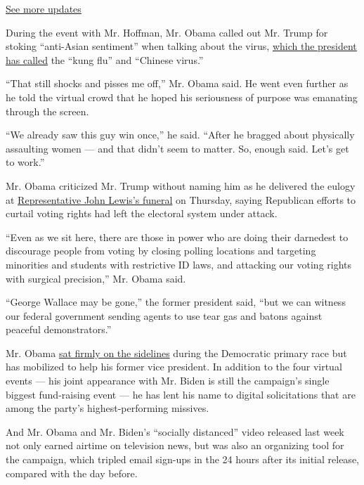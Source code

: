 \href{https://www.nytimes.com/2020/07/31/us/elections/biden-vs-trump.html?action=click\&pgtype=Article\&state=default\&region=MAIN_CONTENT_1\&context=storylines_live_updates}{See
more updates}

During the event with Mr. Hoffman, Mr. Obama called out Mr. Trump for
stoking ``anti-Asian sentiment'' when talking about the virus,
\href{https://www.nytimes.com/2020/03/18/us/politics/china-virus.html}{which
the president has called} the ``kung flu'' and ``Chinese virus.''

``That still shocks and pisses me off,'' Mr. Obama said. He went even
further as he told the virtual crowd that he hoped his seriousness of
purpose was emanating through the screen.

``We already saw this guy win once,'' he said. ``After he bragged about
physically assaulting women --- and that didn't seem to matter. So,
enough said. Let's get to work.''

Mr. Obama criticized Mr. Trump without naming him as he delivered the
eulogy at
\href{https://www.nytimes.com/2020/07/30/us/john-lewis-live-funeral.html}{Representative
John Lewis's funeral} on Thursday, saying Republican efforts to curtail
voting rights had left the electoral system under attack.

``Even as we sit here, there are those in power who are doing their
darnedest to discourage people from voting by closing polling locations
and targeting minorities and students with restrictive ID laws, and
attacking our voting rights with surgical precision,'' Mr. Obama said.

``George Wallace may be gone,'' the former president said, ``but we can
witness our federal government sending agents to use tear gas and batons
against peaceful demonstrators.''

Mr. Obama
\href{https://www.nytimes.com/2020/02/28/us/politics/obama-south-carolina-primary.html}{sat
firmly on the sidelines} during the Democratic primary race but has
mobilized to help his former vice president. In addition to the four
virtual events --- his joint appearance with Mr. Biden is still the
campaign's single biggest fund-raising event --- he has lent his name to
digital solicitations that are among the party's highest-performing
missives.

And Mr. Obama and Mr. Biden's ``socially distanced'' video released last
week not only earned airtime on television news, but was also an
organizing tool for the campaign, which tripled email sign-ups in the 24
hours after its initial release, compared with the day before.

